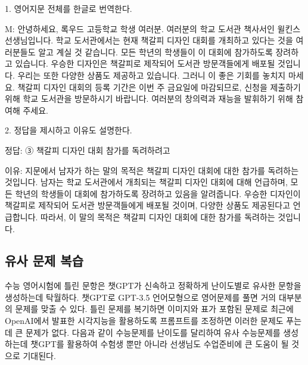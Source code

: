\documentclass[
  letterpaper,
]{book}
\newenvironment{Shaded}{\begin{snugshade}}{\end{snugshade}}
\newcommand{\NormalTok}[1]{\textcolor[rgb]{0.00,0.23,0.31}{#1}}
\begin{document}
\begin{Shaded}
\begin{Highlighting}[]
\NormalTok{1. 영어지문 전체를 한글로 번역한다.}

\NormalTok{M: 안녕하세요, 록우드 고등학교 학생 여러분. 여러분의 학교 도서관 책사서인 윌킨스 선생님입니다. 학교 도서관에서는 현재 책갈피 디자인 대회를 개최하고 있다는 것을 여러분들도 알고 계실 것 같습니다. 모든 학년의 학생들이 이 대회에 참가하도록 장려하고 있습니다. 우승한 디자인은 책갈피로 제작되어 도서관 방문객들에게 배포될 것입니다. 우리는 또한 다양한 상품도 제공하고 있습니다. 그러니 이 좋은 기회를 놓치지 마세요. 책갈피 디자인 대회의 등록 기간은 이번 주 금요일에 마감되므로, 신청을 제출하기 위해 학교 도서관을 방문하시기 바랍니다. 여러분의 창의력과 재능을 발휘하기 위해 참여해 주세요.}

\NormalTok{2. 정답을 제시하고 이유도 설명한다.}

\NormalTok{정답: ③ 책갈피 디자인 대회 참가를 독려하려고}

\NormalTok{이유: 지문에서 남자가 하는 말의 목적은 책갈피 디자인 대회에 대한 참가를 독려하는 것입니다. 남자는 학교 도서관에서 개최되는 책갈피 디자인 대회에 대해 언급하며, 모든 학년의 학생들이 대회에 참가하도록 장려하고 있음을 알려줍니다. 우승한 디자인이 책갈피로 제작되어 도서관 방문객들에게 배포될 것이며, 다양한 상품도 제공된다고 언급합니다. 따라서, 이 말의 목적은 책갈피 디자인 대회에 대한 참가를 독려하는 것입니다.}
\end{Highlighting}
\end{Shaded}

\hypertarget{uxc720uxc0ac-uxbb38uxc81c-uxbcf5uxc2b5}{%
\subsection{유사 문제
복습}\label{uxc720uxc0ac-uxbb38uxc81c-uxbcf5uxc2b5}}

수능 영어시험에 틀린 문항은 챗GPT가 신속하고 정확하게 난이도별로 유사한
문항을 생성하는데 탁월하다. 챗GPT로 GPT-3.5 언어모형으로 영어문제를 풀면
거의 대부분의 문제를 맞출 수 있다. 틀린 문제를 복기하면 이미지와 표가
포함된 문제로 최근에 OpenAI에서 발표한 시각지능을 활용하도록 프롬프트를
조정하면 이러한 문제도 푸는데 큰 문제가 없다. 다음과 같이 수능문제를
난이도를 달리하여 유사 수능문제를 생성하는데 챗GPT를 활용하여 수험생
뿐만 아니라 선생님도 수업준비에 큰 도움이 될 것으로 기대된다.
\end{document}
